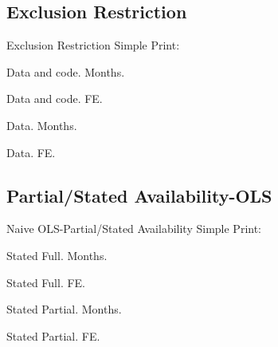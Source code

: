 \documentclass{beamer}
\begin{document}
\subsection{Exclusion Restriction}
\begin{frame}{Exclusion Restriction}
Simple Print:

Data and code. Months.

Data and code. FE.

Data. Months.

Data. FE.
\end{frame}
\begin{frame}{}
\scalebox{0.61}{}
\end{frame}
\begin{frame}{}
\scalebox{0.61}{}
\end{frame}
\begin{frame}{}
\scalebox{0.61}{}
\end{frame}
\begin{frame}{}
\scalebox{0.61}{}
\end{frame}

\subsection{Partial/Stated Availability-OLS}
\begin{frame}{Naive OLS-Partial/Stated Availability}
Simple Print:

Stated Full. Months.

Stated Full. FE.

Stated Partial. Months.

Stated Partial. FE.
\end{frame}

\begin{frame}{}
\scalebox{0.65}{}
\end{frame}

\begin{frame}{}
\scalebox{0.65}{}
\end{frame}

\begin{frame}{}
\scalebox{0.65}{}
\end{frame}
\end{document}
